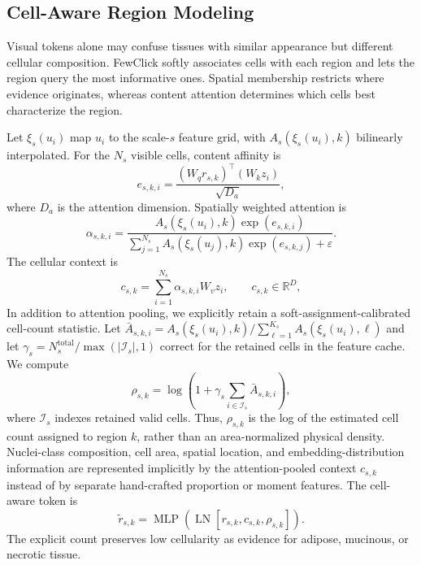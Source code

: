\documentclass[letterpaper]{article}
\begin{document}
\subsection{Cell-Aware Region Modeling}
Visual tokens alone may confuse tissues with similar appearance but different cellular composition. FewClick softly associates cells with each region and lets the region query the most informative ones. Spatial membership restricts where evidence originates, whereas content attention determines which cells best characterize the region.

Let $\xi_s(u_i)$ map $u_i$ to the scale-$s$ feature grid, with $A_s(\xi_s(u_i),k)$ bilinearly interpolated. For the $N_s$ visible cells, content affinity is
\begin{equation}
e_{s,k,i}=
\frac{(W_qr_{s,k})^{\top}(W_kz_i)}{\sqrt{D_a}},
\label{eq:cell-affinity}
\end{equation}
where $D_a$ is the attention dimension. Spatially weighted attention is
\begin{equation}
\alpha_{s,k,i}=
\frac{A_s(\xi_s(u_i),k)\exp(e_{s,k,i})}
{\sum_{j=1}^{N_s}A_s(\xi_s(u_j),k)\exp(e_{s,k,j})+\varepsilon}.
\label{eq:cell-attention}
\end{equation}
The cellular context is
\begin{equation}
c_{s,k}=\sum_{i=1}^{N_s}\alpha_{s,k,i}W_vz_i,
\qquad c_{s,k}\in\mathbb{R}^{D},
\label{eq:cell-context}
\end{equation}
In addition to attention pooling, we explicitly retain a soft-assignment-calibrated cell-count statistic. Let $\bar A_{s,k,i}=A_s(\xi_s(u_i),k)/\sum_{\ell=1}^{K_s}A_s(\xi_s(u_i),\ell)$ and let $\gamma_s=N_s^{\mathrm{total}}/\max(\lvert\mathcal{I}_s\rvert,1)$ correct for the retained cells in the feature cache. We compute
\begin{equation}
\rho_{s,k}=\log\!\left(1+\gamma_s\sum_{i\in\mathcal{I}_s}\bar A_{s,k,i}\right),
\label{eq:cell-count}
\end{equation}
where $\mathcal{I}_s$ indexes retained valid cells. Thus, $\rho_{s,k}$ is the log of the estimated cell count assigned to region $k$, rather than an area-normalized physical density. Nuclei-class composition, cell area, spatial location, and embedding-distribution information are represented implicitly by the attention-pooled context $c_{s,k}$ instead of by separate hand-crafted proportion or moment features. The cell-aware token is
\begin{equation}
\widetilde r_{s,k}=
\operatorname{MLP}\!\left(
\operatorname{LN}[r_{s,k},c_{s,k},\rho_{s,k}]
\right).
\label{eq:cell-fusion}
\end{equation}
The explicit count preserves low cellularity as evidence for adipose, mucinous, or necrotic tissue.
\end{document}
